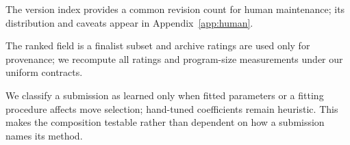 The version index provides a common revision count for human maintenance; its
distribution and caveats appear in Appendix~\ref{app:human}.

The ranked field is a finalist subset and archive ratings are used only for provenance;
we recompute all ratings and program-size measurements under our uniform contracts.

%
%
We classify a submission as learned only when fitted parameters or a fitting procedure
affects move selection; hand-tuned coefficients remain heuristic. This makes the
composition testable rather than dependent on how a submission names its method.

